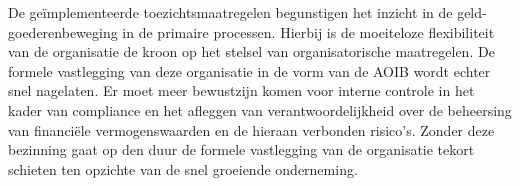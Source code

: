 De geïmplementeerde toezichtsmaatregelen begunstigen het inzicht in de geld-goederenbeweging in de primaire processen. Hierbij is de moeiteloze flexibiliteit van de organisatie de kroon op het stelsel van organisatorische maatregelen. De formele vastlegging van deze organisatie in de vorm van de AOIB wordt echter snel nagelaten. Er moet meer bewustzijn komen voor interne controle in het kader van compliance en het afleggen van verantwoordelijkheid over de beheersing van financiële vermogenswaarden en de hieraan verbonden risico's. Zonder deze bezinning gaat op den duur de formele vastlegging van de organisatie tekort schieten ten opzichte van de snel groeiende onderneming.